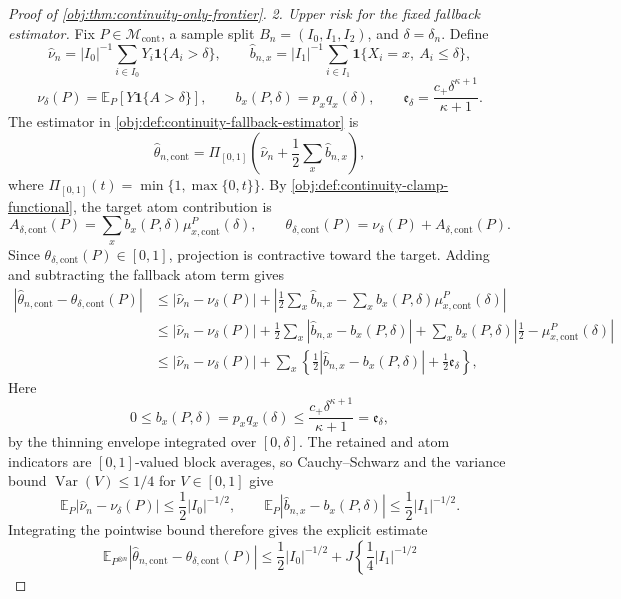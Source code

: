 \begin{proof}[Proof of \cref{obj:thm:continuity-only-frontier}]
\emph{2. Upper risk for the fixed fallback estimator.}
Fix \(P\in\mathcal M_{\mathrm{cont}}\), a sample split \(B_n=(I_0,I_1,I_2)\), and \(\delta=\delta_n\).  Define
\[
\widehat\nu_n
=
|I_0|^{-1}\sum_{i\in I_0}Y_i\mathbf 1\{A_i>\delta\},
\qquad
\widehat b_{n,x}
=
|I_1|^{-1}\sum_{i\in I_1}\mathbf 1\{X_i=x,\ A_i\leq\delta\},
\]
\[
\nu_\delta(P)=\mathbb E_P[Y\mathbf 1\{A>\delta\}],
\qquad
b_x(P,\delta)=p_xq_x(\delta),
\qquad
\mathfrak e_\delta=\frac{c_+\delta^{\kappa+1}}{\kappa+1}.
\]
The estimator in \cref{obj:def:continuity-fallback-estimator} is
\[
\widehat\theta_{n,\mathrm{cont}}
=
\Pi_{[0,1]}\!\left(\widehat\nu_n+\frac12\sum_x\widehat b_{n,x}\right),
\]
where \(\Pi_{[0,1]}(t)=\min\{1,\max\{0,t\}\}\).  By \cref{obj:def:continuity-clamp-functional}, the target atom contribution is
\[
A_{\delta,\mathrm{cont}}(P)
=
\sum_x b_x(P,\delta)\mu_{x,\mathrm{cont}}^P(\delta),
\qquad
\theta_{\delta,\mathrm{cont}}(P)=\nu_\delta(P)+A_{\delta,\mathrm{cont}}(P).
\]
Since \(\theta_{\delta,\mathrm{cont}}(P)\in[0,1]\), projection is contractive toward the target.  Adding and subtracting the fallback atom term gives
\[
\begin{aligned}
\left|\widehat\theta_{n,\mathrm{cont}}-\theta_{\delta,\mathrm{cont}}(P)\right|
&\leq
\left|\widehat\nu_n-\nu_\delta(P)\right|
+\left|\frac12\sum_x\widehat b_{n,x}
      -\sum_x b_x(P,\delta)\mu_{x,\mathrm{cont}}^P(\delta)\right|\\
&\leq
\left|\widehat\nu_n-\nu_\delta(P)\right|
+\frac12\sum_x\left|\widehat b_{n,x}-b_x(P,\delta)\right|
+\sum_x b_x(P,\delta)\left|\frac12-\mu_{x,\mathrm{cont}}^P(\delta)\right|\\
&\leq
\left|\widehat\nu_n-\nu_\delta(P)\right|
+\sum_x\left\{
\frac12\left|\widehat b_{n,x}-b_x(P,\delta)\right|
+\frac12\mathfrak e_\delta
\right\},
\end{aligned}
\]
Here
\[
0\leq b_x(P,\delta)=p_xq_x(\delta)
\leq \frac{c_+\delta^{\kappa+1}}{\kappa+1}
=\mathfrak e_\delta,
\]
by the thinning envelope integrated over \([0,\delta]\).  The retained and atom indicators are
\([0,1]\)-valued block averages, so Cauchy--Schwarz and the variance bound
\(\operatorname{Var}(V)\leq1/4\) for \(V\in[0,1]\) give
\[
\mathbb E_P\left|\widehat\nu_n-\nu_\delta(P)\right|
\leq \frac12 |I_0|^{-1/2},
\qquad
\mathbb E_P\left|\widehat b_{n,x}-b_x(P,\delta)\right|
\leq \frac12 |I_1|^{-1/2}.
\]
Integrating the pointwise bound therefore gives the explicit estimate
\[
\mathbb E_{P^{\otimes n}}
\left|\widehat\theta_{n,\mathrm{cont}}-\theta_{\delta,\mathrm{cont}}(P)\right|
\leq
\frac12 |I_0|^{-1/2}
+J\left\{\frac14 |I_1|^{-1/2}
\]
\end{proof}
